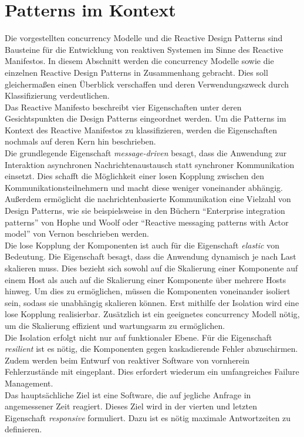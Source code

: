 \section{Patterns im Kontext}

Die vorgestellten \gls{concurrency} Modelle und die Reactive Design Patterns sind Bausteine für die Entwicklung von reaktiven Systemen im Sinne des Reactive Manifestos. In diesem Abschnitt werden die \gls{concurrency} Modelle sowie die einzelnen Reactive Design Patterns in Zusammenhang gebracht. Dies soll gleichermaßen einen Überblick verschaffen und deren Verwendungszweck durch Klassifizierung verdeutlichen.\\
Das Reactive Manifesto beschreibt vier Eigenschaften unter deren Gesichtspunkten die Design Patterns eingeordnet werden. Um die Patterns im Kontext des Reactive Manifestos zu klassifizieren, werden die Eigenschaften nochmals auf deren Kern hin beschrieben.\\

Die grundlegende Eigenschaft \textit{message-driven} besagt, dass die Anwendung zur Interaktion asynchronen Nachrichtenaustausch statt synchroner Kommunikation einsetzt. Dies schafft die Möglichkeit einer losen Kopplung zwischen den Kommunikationsteilnehmern und macht diese weniger voneinander abhängig. Außerdem ermöglicht die nachrichtenbasierte Kommunikation eine Vielzahl von Design Patterns, wie sie beispielsweise in den Büchern \enquote{Enterprise integration patterns} von Hophe und Woolf oder \enquote{Reactive messaging patterns with Actor model} von Vernon beschrieben werden.\\
Die lose Kopplung der Komponenten ist auch für die Eigenschaft \textit{elastic} von Bedeutung. Die Eigenschaft besagt, dass die Anwendung dynamisch je nach Last skalieren muss. Dies bezieht sich sowohl auf die Skalierung einer Komponente auf einem Host als auch auf die Skalierung einer Komponente über mehrere Hosts hinweg. Um dies zu ermöglichen, müssen die Komponenten voneinander isoliert sein, sodass sie unabhängig skalieren können. Erst mithilfe der Isolation wird eine lose Kopplung realisierbar. Zusätzlich ist ein geeignetes \gls{concurrency} Modell nötig, um die Skalierung effizient und wartungsarm zu ermöglichen.\\

Die Isolation erfolgt nicht nur auf funktionaler Ebene. Für die Eigenschaft \textit{resilient} ist es nötig, die Komponenten gegen kaskadierende Fehler abzuschirmen. Zudem werden beim Entwurf von reaktiver Software von vornherein Fehlerzustände mit eingeplant. Dies erfordert wiederum ein umfangreiches Failure Management.\\
Das hauptsächliche Ziel ist eine Software, die auf jegliche Anfrage in angemessener Zeit reagiert. Dieses Ziel wird in der vierten und letzten Eigenschaft \textit{responsive} formuliert. Dazu ist es nötig maximale Antwortzeiten zu definieren.\\

